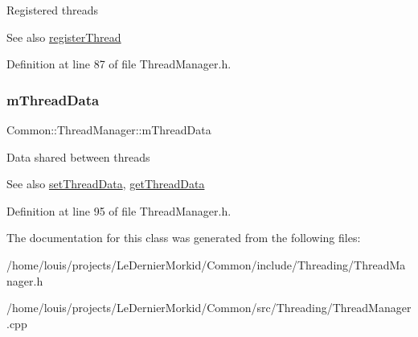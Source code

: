 Registered threads \begin{DoxySeeAlso}{See also}
\hyperlink{class_common_1_1_thread_manager_a79a947a3ff5c8a34e51cc41007832aeb}{register\+Thread} 
\end{DoxySeeAlso}


Definition at line 87 of file Thread\+Manager.\+h.

\mbox{\label{class_common_1_1_thread_manager_a2a3cc720d802c7270f36bbb69fc19a98}} 
\subsubsection{\texorpdfstring{m\+Thread\+Data}{mThreadData}}
{\footnotesize\ttfamily Common\+::\+Thread\+Manager\+::m\+Thread\+Data\hspace{0.3cm}{\ttfamily [protected]}}

Data shared between threads \begin{DoxySeeAlso}{See also}
\hyperlink{class_common_1_1_thread_manager_aed92881e192cdfb4ab3d28c465f3a900}{set\+Thread\+Data}, \hyperlink{class_common_1_1_thread_manager_aaad49e99ae379d164451cb3cbae002eb}{get\+Thread\+Data} 
\end{DoxySeeAlso}


Definition at line 95 of file Thread\+Manager.\+h.



The documentation for this class was generated from the following files\+:\begin{DoxyCompactItemize}
\item 
/home/louis/projects/\+Le\+Dernier\+Morkid/\+Common/include/\+Threading/Thread\+Manager.\+h\item 
/home/louis/projects/\+Le\+Dernier\+Morkid/\+Common/src/\+Threading/Thread\+Manager.\+cpp\end{DoxyCompactItemize}
